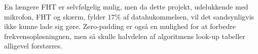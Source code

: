 En længere FHT er selvfølgelig mulig, men da dette projekt, udelukkende med mikrofon, FHT og skærm, fylder $17 \%$ af datahukommelsen, vil det sandsynligvis ikke kunne lade sig gøre. 
Zero-padding er også en mulighed for at forbedre frekvensopløsningnen, men så skulle halvdelen af algoritmens look-up tabeller alligevel forstørres. 
